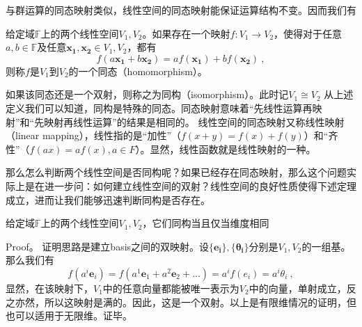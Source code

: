 

与群运算的同态映射类似，线性空间的同态映射能保证运算结构不变。因而我们有
\begin{definition}{}
给定域$\mathbb F$上的两个线性空间$V_1,V_2$。如果存在一个映射$f:V_1\rightarrow V_2$，使得对于任意$a,b\in \mathbb F$及任意$\boldsymbol{x_1,x_2}\in V_1,V_2$，都有
\begin{equation}
f(a\boldsymbol {x_1}+b\boldsymbol {x_2})=af(\boldsymbol {x_1})+bf(\boldsymbol {x_2})~,
\end{equation}
则称$f$是$V_1$到$V_2$的一个同态（homomorphism）。
\end{definition}
如果该同态还是一个双射，则称之为同构（isomorphism）。此时记$V_1\cong V_2$
从上述定义我们可以知道，同构是特殊的同态。同态映射意味着“先线性运算再映射”和“先映射再线性运算”的结果是相同的。
线性空间的同态映射又称线性映射（linear mapping），线性指的是“加性”（$f(x+y)=f(x)+f(y)$）和“齐性”（$f(ax)=af(x),a\in F$）。显然，线性函数就是线性映射的一种。

那么怎么判断两个线性空间是否同构呢？如果已经存在同态映射，那么这个问题实际上是在进一步问：如何建立线性空间的双射？线性空间的良好性质使得下述定理成立，进而让我们能够迅速判断同构是否存在。
\begin{theorem}{}
给定域$\mathbb F$上的两个线性空间$V_1,V_2$，它们同构当且仅当维度相同
\end{theorem}
Proof。
证明思路是建立basis之间的双映射。设$\{\boldsymbol{e_i}\},\{\boldsymbol{\theta_i}\}$分别是$V_1,V_2$的一组基。那么我们有
\begin{equation}
f(a^i\boldsymbol e_i)=f(a^1\boldsymbol e_1+a^2\boldsymbol e_2+...)=a^if(e_i)=a^i\theta_i~,
\end{equation}
显然，在该映射下，$V_1$中的任意向量都能被唯一表示为$V_2$中的向量，单射成立，反之亦然，所以这映射是满的。因此，这是一个双射。以上是有限维情况的证明，但也可以适用于无限维。证毕。